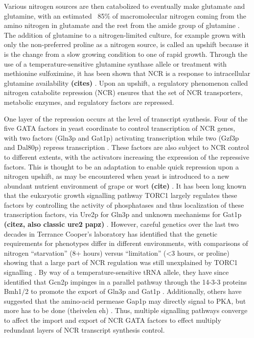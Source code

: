 Various
nitrogen sources are then catabolized to eventually make glutamate and
glutamine, with an estimated ~85\% of macromolecular nitrogen coming
from the amino nitrogen in glutamate and the rest from the amide group
of glutamine 
\citep{magasanik2002nitrogen}. The addition of glutamine to
a nitrogen-limited culture, for example grown with only the
non-preferred proline as a nitrogen source, is called an upshift
because it is the change from a slow growing condition to one of rapid
growth. Through the use of a temperature-sensitive glutamine synthase
allele or treatment with methionine sulfoximine, it has been shown
that NCR is a response to intracellular glutamine availability
\textbf{(cites)}
. Upon an upshift, a regulatory phenomenon called nitrogen
catabolite repression (NCR) ensures that the set of NCR transporters,
metabolic enzymes, and regulatory factors are repressed.  

One layer of
the repression occurs at the level of transcript synthesis. Four of
the five GATA factors in yeast coordinate to control transcription of
NCR genes, with two factors (Gln3p and Gat1p) activating transcription
while two (Gzf3p and Dal80p) repress transcription 
\citep{hahn2011transcriptional,stanbrough1995transcriptional}. 
These factors are also subject to NCR
control to different extents, with the activators increasing the
expression of the repressive factors. This is thought to be an
adaptation to enable quick repression upon a nitrogen upshift, as may
be encountered when yeast is introduced to a new abundant nutrient
environment of grape or wort 
\textbf{(cite)}
. It has been long known that the
eukaryotic growth signalling pathway TORC1 largely regulates these
factors by controlling the activity of phosphatases and thus
localization of these transcription factors, via Ure2p for Gln3p 
\citep{beck1999tor} 
and unknown mechanisms for Gat1p
\textbf{(citez, also classic ure2 papz)}
. However, careful genetics over the last two decades in
Terrance Cooper’s laboratory has identified that the genetic
requirements for phenotypes differ in different environments, with
comparisons of nitrogen “starvation” (8+ hours) versus “limitation”
(<3 hours, or proline) showing that a large part of NCR regulation was
still unexplained by TORC1 signalling 
\citep{tate2013five}. By way
of a temperature-sensitive tRNA allele, they have since identified
that Gcn2p impinges in a parallel pathway through the 14-3-3 proteins
Bmh1/2 to promote the export of Gln3p and Gat1p 
\citep{tate2015gata,tate2015nitrogen,tate2017general}. 
Additionally, others have suggested that the
amino-acid permease Gap1p may directly signal to PKA, but more has to
be done 
(theivelen eh)
. Thus, multiple signalling pathways converge to
affect the import and export of NCR GATA factors to effect multiply
redundant layers of NCR transcript synthesis control.  

